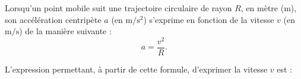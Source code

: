 
Lorsqu'un point mobile suit une trajectoire circulaire de rayon $R$, en mètre (m), son accélération centripète $a$ (en $\text{m}/\text{s}^{2}$) s'exprime en fonction de la vitesse $v$ (en $\text{m}/\text{s}$) de la manière suivante : \[
a=\frac{v^{2}}{R}. \]

L'expression permettant, à partir de cette formule, d'exprimer la vitesse $v$ est :

\smallskip

